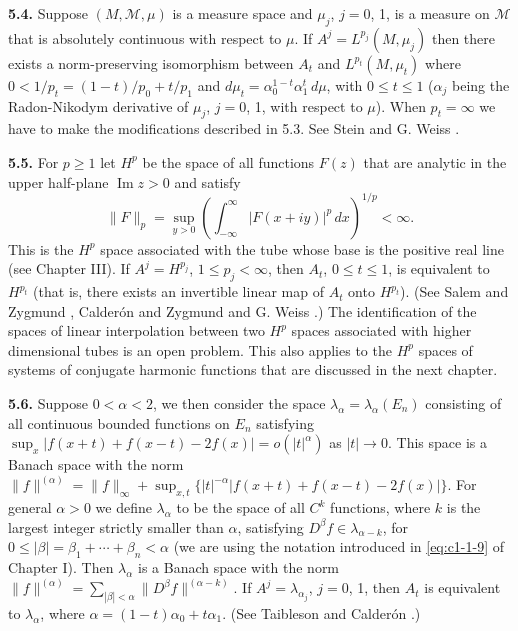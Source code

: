 \textbf{5.4.} Suppose $(M, \mathcal{M}, \mu)$ is a measure space and
$\mu_{j}$, $j = 0$, 1, is a measure on $\mathcal{M}$ that is absolutely
continuous with respect to $\mu$. If $A^{j} = L^{p_{j}}(M, \mu_{j})$ then
there exists a norm-preserving isomorphism between $A_{t}$ and
$L^{p_{t}}(M, \mu_{t})$ where
$0 < 1/p_{t} = (1 - t)/p_{0} + t/p_{1}$ and
$d\mu_{t} = \alpha_{0}^{1-t}\alpha_{1}^{t}\,d\mu$, with $0 \leq t \leq 1$
($\alpha_{j}$ being the Radon-Nikodym derivative of $\mu_{j}$, $j = 0$, 1, with
respect to $\mu$). When $p_{t} = \infty$ we have to make the modifications
described in 5.3. See Stein and G. Weiss \cite{SteinWeiss5}.

\textbf{5.5.} For $p \geq 1$ let $H^{p}$ be the space of all functions
$F(z)$ that are analytic in the upper half-plane $\operatorname{Im} z > 0$ and
satisfy
\[
\|F\|_{p}=\sup_{y>0}\left(\int_{-\infty}^{\infty}|F(x+iy)|^{p}\,dx\right)^{1/p}<\infty.
\]
This is the $H^{p}$ space associated with the tube whose base is the positive
real line (see Chapter III). If $A^{j} = H^{p_{j}}$, $1 \leq p_{j} < \infty$,
then $A_{t}$, $0 \leq t \leq 1$, is equivalent to $H^{p_{t}}$ (that is, there
exists an invertible linear map of $A_{t}$ onto $H^{p_{t}}$). (See Salem and
Zygmund \cite{SalemZygmund1}, Calder\'on and Zygmund \cite{CalderonZygmund2}
and G. Weiss \cite{Weiss1}.) The identification of the spaces of linear
interpolation between two $H^{p}$ spaces associated with higher dimensional
tubes is an open problem. This also applies to the $H^{p}$ spaces of systems of
conjugate harmonic functions that are discussed in the next chapter.

\textbf{5.6.} Suppose $0 < \alpha < 2$, we then consider the space
$\lambda_{\alpha} = \lambda_{\alpha}(E_{n})$ consisting of all continuous
bounded functions on $E_{n}$ satisfying
$\sup_{x}|f(x + t) + f(x - t) - 2f(x)| = o(|t|^{\alpha})$ as $|t| \to 0$. This
space is a Banach space with the norm
$\|f\|^{(\alpha)} = \|f\|_{\infty} + \sup_{x,t}\{|t|^{-\alpha}|f(x + t) + f(x - t) - 2f(x)|\}$.
For general $\alpha > 0$ we define $\lambda_{\alpha}$ to be the space of all
$C^{k}$ functions, where $k$ is the largest integer strictly smaller than
$\alpha$, satisfying $D^{\beta}f \in \lambda_{\alpha-k}$, for
$0 \leq |\beta| = \beta_{1} + \cdots + \beta_{n} < \alpha$ (we are using the
notation introduced in \eqref{eq:c1-1-9} of Chapter I). Then $\lambda_{\alpha}$
is a Banach space with the norm
$\|f\|^{(\alpha)} = \sum_{|\beta| < \alpha}\|D^{\beta}f\|^{(\alpha-k)}$. If
$A^{j} = \lambda_{\alpha_{j}}$, $j = 0$, 1, then $A_{t}$ is equivalent to
$\lambda_{\alpha}$, where $\alpha = (1 - t)\alpha_{0} + t\alpha_{1}$. (See
Taibleson \cite{Taibleson1} and Calder\'on \cite{Calderon2}.)

